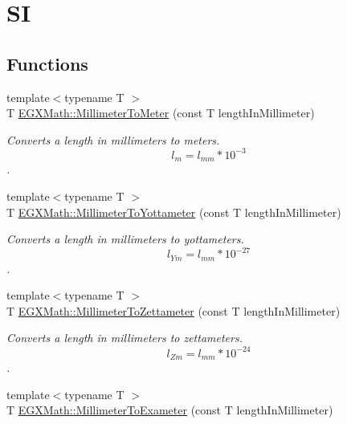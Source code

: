 \hypertarget{group___e_g_x_math-_conversions-_length_conversions-_millimeter-_s_i}{}\section{SI}
\label{group___e_g_x_math-_conversions-_length_conversions-_millimeter-_s_i}
\subsection*{Functions}
\begin{DoxyCompactItemize}
\item 
{\footnotesize template$<$typename T $>$ }\\T \mbox{\hyperlink{group___e_g_x_math-_conversions-_length_conversions-_millimeter-_s_i_ga5bf52177bcfa3cce836b7cec4dcf5fb5}{E\+G\+X\+Math\+::\+Millimeter\+To\+Meter}} (const T length\+In\+Millimeter)
\begin{DoxyCompactList}\small\item\em Converts a length in millimeters to meters. \[ l_{m}=l_{mm} * 10^{-3} \]. \end{DoxyCompactList}\item 
{\footnotesize template$<$typename T $>$ }\\T \mbox{\hyperlink{group___e_g_x_math-_conversions-_length_conversions-_millimeter-_s_i_ga0c63bb9317c6f47942e00d23d0bf9762}{E\+G\+X\+Math\+::\+Millimeter\+To\+Yottameter}} (const T length\+In\+Millimeter)
\begin{DoxyCompactList}\small\item\em Converts a length in millimeters to yottameters. \[ l_{Ym}=l_{mm} * 10^{-27} \]. \end{DoxyCompactList}\item 
{\footnotesize template$<$typename T $>$ }\\T \mbox{\hyperlink{group___e_g_x_math-_conversions-_length_conversions-_millimeter-_s_i_ga06531acdd75d87de598010df5c9536f5}{E\+G\+X\+Math\+::\+Millimeter\+To\+Zettameter}} (const T length\+In\+Millimeter)
\begin{DoxyCompactList}\small\item\em Converts a length in millimeters to zettameters. \[ l_{Zm}=l_{mm} * 10^{-24} \]. \end{DoxyCompactList}\item 
{\footnotesize template$<$typename T $>$ }\\T \mbox{\hyperlink{group___e_g_x_math-_conversions-_length_conversions-_millimeter-_s_i_gaceb47f60171d86e6d552801e9a552530}{E\+G\+X\+Math\+::\+Millimeter\+To\+Exameter}} (const T length\+In\+Millimeter)

\end{DoxyCompactItemize}
